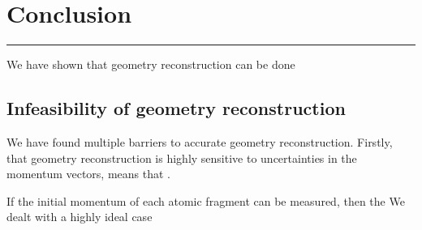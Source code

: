 \chapter{Conclusion}\label{ch:conclusion}

\vspace{-1.5 em}
\begin{addmargin}[-0.5cm]{0cm}
  \minitoc
\end{addmargin}
\hrule
\vspace{1.5 em}

We have shown that geometry reconstruction can be done 

\section*{Infeasibility of geometry reconstruction}
We have found multiple barriers to accurate geometry reconstruction. Firstly, that geometry reconstruction is highly sensitive to uncertainties in the momentum vectors, means that .

If the initial momentum of each atomic fragment can be measured, then the 
We dealt with a highly ideal case


